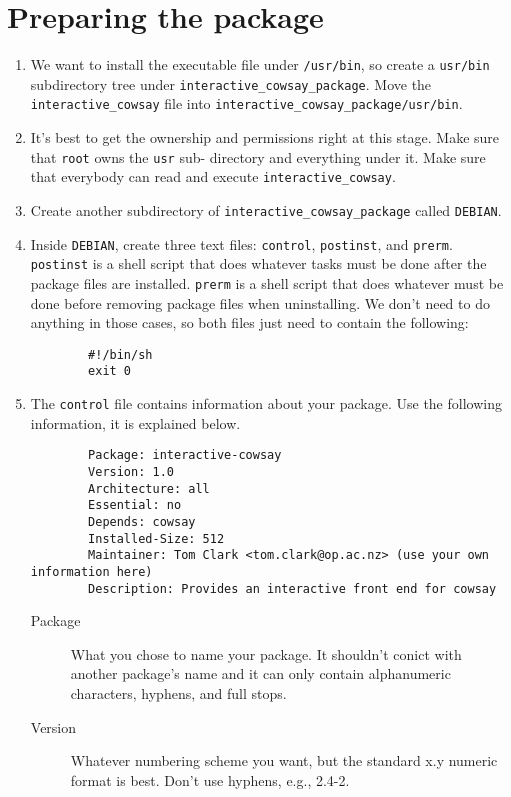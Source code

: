 \documentclass{article}
\begin{document}
\section{Preparing the package}
\begin{enumerate}
	\item We want to install the executable file under \texttt{/usr/bin}, so create a \texttt{usr/bin} subdirectory tree under
		\texttt{interactive\_cowsay\_package}. Move the \texttt{interactive\_cowsay} file into \texttt{interactive\_cowsay\_package/usr/bin}.
	\item It's best to get the ownership and permissions right at this stage. Make sure that \texttt{root} owns the \texttt{usr} sub-
		directory and everything under it. Make sure that everybody can read and execute \texttt{interactive\_cowsay}.
	\item Create another subdirectory of \texttt{interactive\_cowsay\_package} called \texttt{DEBIAN}.
	\item Inside \texttt{DEBIAN}, create three text files: \texttt{control}, \texttt{postinst}, and \texttt{prerm}.
		\texttt{postinst} is a shell script that does whatever tasks must be done after the package files are installed.
		\texttt{prerm} is a shell script that does whatever must be done before removing package files when uninstalling.
		We don't need to do anything in those cases, so both files just need to contain the following:

		\begin{verbatim}
		#!/bin/sh
		exit 0
		\end{verbatim}
\newpage

	\item The \texttt{control} file contains information about your package. Use the following information, it is explained below.
		\begin{verbatim}
		Package: interactive-cowsay
		Version: 1.0
		Architecture: all
		Essential: no
		Depends: cowsay
		Installed-Size: 512
		Maintainer: Tom Clark <tom.clark@op.ac.nz> (use your own information here)
		Description: Provides an interactive front end for cowsay
		\end{verbatim}

		\begin{description}
			\item[Package]What you chose to name your package. It shouldn't conict with another package's name and it can only contain alphanumeric characters, hyphens, and full stops.
                        \item[Version]Whatever numbering scheme you want, but the standard x.y numeric format is best. Don't use hyphens, e.g., 2.4-2.


\end{description}
\end{enumerate}
\end{document}
